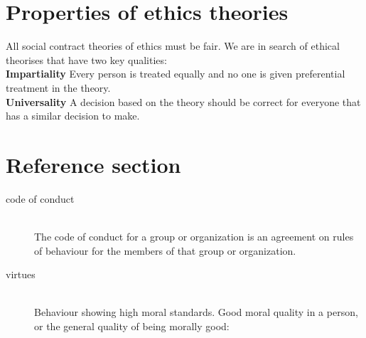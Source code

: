 \documentclass{article}
\begin{document}
\section{Properties of ethics theories}

\begin{flushleft}
All social contract theories of ethics must be fair. We are in search of ethical theorises that have two key qualities:\\
\textbf{Impartiality} Every person is treated equally and no one is given preferential
treatment in the theory.\\
\textbf{Universality} A decision based on the theory should be correct for everyone that has a similar decision to make. 
\end{flushleft}


\pagebreak

\section*{Reference section} \label{sec:reference}
\begin{description}
	\item[code of conduct] \hfill \\ The code of conduct for a group or organization is an agreement on rules of behaviour for the members of that group or organization.
  \item[virtues] \hfill \\ Behaviour showing high moral standards. Good moral quality in a person, or the general quality of being morally good:
\end{description}
\end{document}
